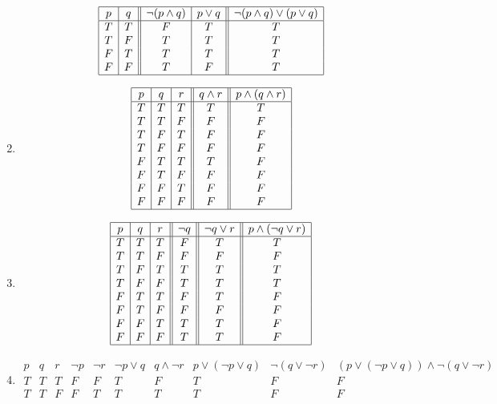 \documentclass{article}
\begin{document}
\begin{enumerate}[label=\textbf{\arabic*.}]
\[\begin{array}{|c|c||c|c||c|}
\hline
p & q & \neg (p \land q) & p \lor q & \neg (p \land q) \lor (p \lor q)\\
\hline
T & T & F & T & T \\
T & F & T & T & T \\
F & T & T & T & T \\
F & F & T & F & T \\
\hline
\end{array}
\]
\item %
\[
\begin{array}{|c|c|c||c||c|}
\hline
p & q & r & q \land r & p \land (q \land r)\\
\hline
T & T & T & T & T \\
T & T & F & F & F \\
T & F & T & F & F \\
T & F & F & F & F \\
F & T & T & T & F \\
F & T & F & F & F \\
F & F & T & F & F \\
F & F & F & F & F \\
\hline
\end{array}
\]
\item %
\[
\begin{array}{|c|c|c||c||c||c|}
\hline
p & q & r & \neg q & \neg q \lor r & p \land (\neg q \lor r)\\
\hline
T & T & T & F & T & T \\
T & T & F & F & F & F \\
T & F & T & T & T & T \\
T & F & F & T & T & T \\
F & T & T & F & T & F \\
F & T & F & F & F & F \\
F & F & T & T & T & F \\
F & F & F & T & T & F \\
\hline
\end{array}
\]
\item %
\[
\begin{array}{|c|c|c||c|c||c|c||c|c||c|}
\hline
p & q & r & \neg p & \neg r & \neg p \lor q & q \land \neg r & p \lor (\neg p \lor q) & \neg (q \lor \neg r) & (p \lor (\neg p \lor q)) \land \neg(q \lor \neg r)\\
\hline
T & T & T & F & F & T & F & T & F & F \\
T & T & F & F & T & T & T & T & F & F \\

\end{array}\]
\end{enumerate}
\end{document}
